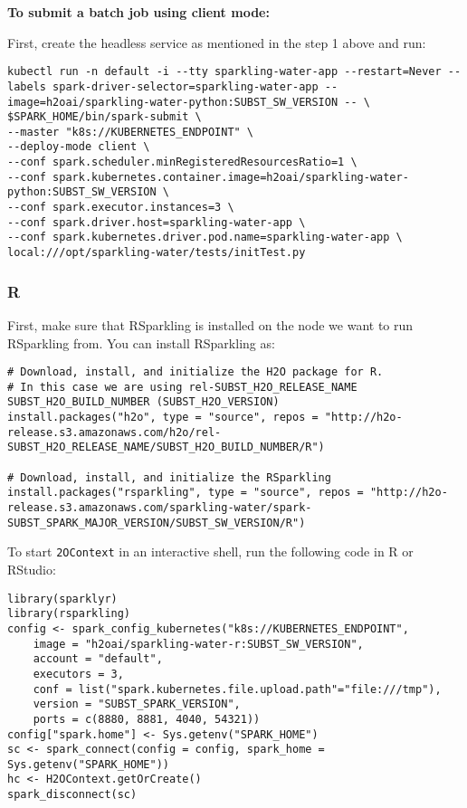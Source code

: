 \textbf{To submit a batch job using client mode:}

First, create the headless service as mentioned in the step 1 above and run:

\begin{lstlisting}[style=Bash]
kubectl run -n default -i --tty sparkling-water-app --restart=Never --labels spark-driver-selector=sparkling-water-app --image=h2oai/sparkling-water-python:SUBST_SW_VERSION -- \
$SPARK_HOME/bin/spark-submit \
--master "k8s://KUBERNETES_ENDPOINT" \
--deploy-mode client \
--conf spark.scheduler.minRegisteredResourcesRatio=1 \
--conf spark.kubernetes.container.image=h2oai/sparkling-water-python:SUBST_SW_VERSION \
--conf spark.executor.instances=3 \
--conf spark.driver.host=sparkling-water-app \
--conf spark.kubernetes.driver.pod.name=sparkling-water-app \
local:///opt/sparkling-water/tests/initTest.py
\end{lstlisting}

\subsubsection{R}

First, make sure that RSparkling is installed on the node we want to run RSparkling from.
You can install RSparkling as:

\begin{lstlisting}[style=R]
# Download, install, and initialize the H2O package for R.
# In this case we are using rel-SUBST_H2O_RELEASE_NAME SUBST_H2O_BUILD_NUMBER (SUBST_H2O_VERSION)
install.packages("h2o", type = "source", repos = "http://h2o-release.s3.amazonaws.com/h2o/rel-SUBST_H2O_RELEASE_NAME/SUBST_H2O_BUILD_NUMBER/R")

# Download, install, and initialize the RSparkling
install.packages("rsparkling", type = "source", repos = "http://h2o-release.s3.amazonaws.com/sparkling-water/spark-SUBST_SPARK_MAJOR_VERSION/SUBST_SW_VERSION/R")
\end{lstlisting}


To start \texttt{2OContext} in an interactive shell, run the following code in R or RStudio:

\begin{lstlisting}[style=R]
library(sparklyr)
library(rsparkling)
config <- spark_config_kubernetes("k8s://KUBERNETES_ENDPOINT",
    image = "h2oai/sparkling-water-r:SUBST_SW_VERSION",
    account = "default",
    executors = 3,
    conf = list("spark.kubernetes.file.upload.path"="file:///tmp"),
    version = "SUBST_SPARK_VERSION",
    ports = c(8880, 8881, 4040, 54321))
config["spark.home"] <- Sys.getenv("SPARK_HOME")
sc <- spark_connect(config = config, spark_home = Sys.getenv("SPARK_HOME"))
hc <- H2OContext.getOrCreate()
spark_disconnect(sc)
\end{lstlisting}


